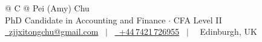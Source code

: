 \begin{tabularx}{\linewidth}{@{} C @{}}
\Huge{Pei (Amy) Chu} \\[5pt]
{\normalsize PhD Candidate in Accounting and Finance $\cdot$ CFA Level II} \\[5pt]
\href{mailto:zjjxitongchu@gmail.com}{\raisebox{-0.05\height}\faEnvelope\ zjjxitongchu@gmail.com} \ $|$ \
\href{tel:+447421726955}{\raisebox{-0.05\height}\faMobile\ +44\,7421\,726955} \ $|$ \
\raisebox{-0.05\height}\faMapMarker*\ Edinburgh, UK \\
\end{tabularx}
